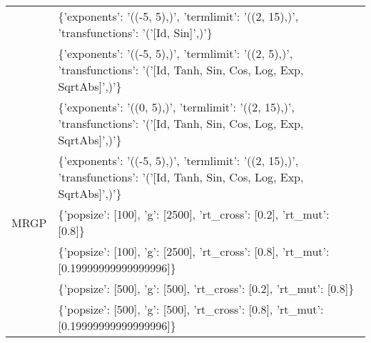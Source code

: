 \begin{tabular}{l p{37em}}
              &                                                                                                                                                                                                                       \{'exponents': '((-5, 5),)', 'termlimit': '((2, 15),)', 'transfunctions': '('[Id, Sin]',)'\} \\
              &                                                                                                                                                                                          \{'exponents': '((-5, 5),)', 'termlimit': '((2, 5),)', 'transfunctions': '('[Id, Tanh, Sin, Cos, Log, Exp, SqrtAbs]',)'\} \\
              &                                                                                                                                                                                          \{'exponents': '((0, 5),)', 'termlimit': '((2, 15),)', 'transfunctions': '('[Id, Tanh, Sin, Cos, Log, Exp, SqrtAbs]',)'\} \\
              &                                                                                                                                                                                         \{'exponents': '((-5, 5),)', 'termlimit': '((2, 15),)', 'transfunctions': '('[Id, Tanh, Sin, Cos, Log, Exp, SqrtAbs]',)'\} \\
         MRGP &                                                                                                                                                                                                                                              \{'popsize': [100], 'g': [2500], 'rt\_cross': [0.2], 'rt\_mut': [0.8]\} \\
              &                                                                                                                                                                                                                              \{'popsize': [100], 'g': [2500], 'rt\_cross': [0.8], 'rt\_mut': [0.19999999999999996]\} \\
              &                                                                                                                                                                                                                                               \{'popsize': [500], 'g': [500], 'rt\_cross': [0.2], 'rt\_mut': [0.8]\} \\
              &                                                                                                                                                                                                                               \{'popsize': [500], 'g': [500], 'rt\_cross': [0.8], 'rt\_mut': [0.19999999999999996]\} \\

\end{tabular}
